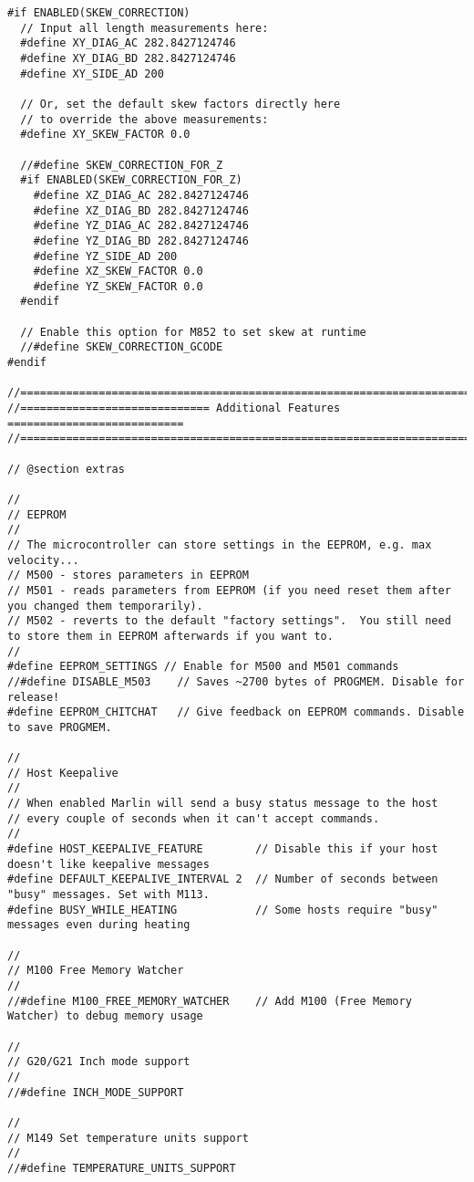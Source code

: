 \begin{lstlisting}
#if ENABLED(SKEW_CORRECTION)
  // Input all length measurements here:
  #define XY_DIAG_AC 282.8427124746
  #define XY_DIAG_BD 282.8427124746
  #define XY_SIDE_AD 200

  // Or, set the default skew factors directly here
  // to override the above measurements:
  #define XY_SKEW_FACTOR 0.0

  //#define SKEW_CORRECTION_FOR_Z
  #if ENABLED(SKEW_CORRECTION_FOR_Z)
    #define XZ_DIAG_AC 282.8427124746
    #define XZ_DIAG_BD 282.8427124746
    #define YZ_DIAG_AC 282.8427124746
    #define YZ_DIAG_BD 282.8427124746
    #define YZ_SIDE_AD 200
    #define XZ_SKEW_FACTOR 0.0
    #define YZ_SKEW_FACTOR 0.0
  #endif

  // Enable this option for M852 to set skew at runtime
  //#define SKEW_CORRECTION_GCODE
#endif

//=============================================================================
//============================= Additional Features ===========================
//=============================================================================

// @section extras

//
// EEPROM
//
// The microcontroller can store settings in the EEPROM, e.g. max velocity...
// M500 - stores parameters in EEPROM
// M501 - reads parameters from EEPROM (if you need reset them after you changed them temporarily).
// M502 - reverts to the default "factory settings".  You still need to store them in EEPROM afterwards if you want to.
//
#define EEPROM_SETTINGS // Enable for M500 and M501 commands
//#define DISABLE_M503    // Saves ~2700 bytes of PROGMEM. Disable for release!
#define EEPROM_CHITCHAT   // Give feedback on EEPROM commands. Disable to save PROGMEM.

//
// Host Keepalive
//
// When enabled Marlin will send a busy status message to the host
// every couple of seconds when it can't accept commands.
//
#define HOST_KEEPALIVE_FEATURE        // Disable this if your host doesn't like keepalive messages
#define DEFAULT_KEEPALIVE_INTERVAL 2  // Number of seconds between "busy" messages. Set with M113.
#define BUSY_WHILE_HEATING            // Some hosts require "busy" messages even during heating

//
// M100 Free Memory Watcher
//
//#define M100_FREE_MEMORY_WATCHER    // Add M100 (Free Memory Watcher) to debug memory usage

//
// G20/G21 Inch mode support
//
//#define INCH_MODE_SUPPORT

//
// M149 Set temperature units support
//
//#define TEMPERATURE_UNITS_SUPPORT


\end{lstlisting}
